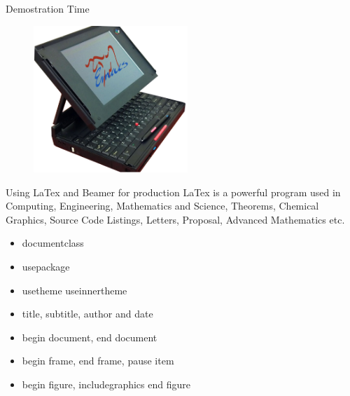 \documentclass[english,12pt,presentation]{beamer}
\begin{document}
\begin{frame}{Demostration Time}
\begin{figure}
\centering
\includegraphics[width=220]{images/emachine.png}
\end{figure}
\titlepage
\end{frame}

\begin{frame}{Using LaTex and Beamer for production}
LaTex is a powerful program used in \pause Computing, \pause Engineering, \pause Mathematics and Science, \pause Theorems, \pause Chemical Graphics, \pause Source Code Listings, \pause Letters, \pause Proposal, \pause Advanced Mathematics etc.
\begin{itemize}
\pause \item documentclass
\pause \item usepackage
\pause \item usetheme \pause useinnertheme
\pause \item title, \pause subtitle, \pause author \pause and date
\pause \item begin document, \pause end document
\pause \item begin frame, \pause end frame, \pause pause item
\pause \item begin figure, \pause includegraphics \pause end figure
\end{itemize}
\end{frame}
\end{document}

